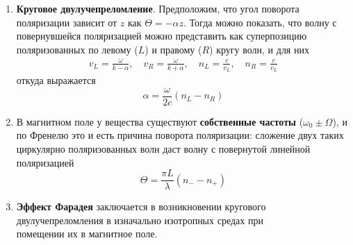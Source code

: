 \documentclass[10pt,pdf,hyperref={unicode}, dvipsnames]{beamer}
\begin{document}

\begin{frame}[t]
	\begin{enumerate}
		\item \textbf{Круговое двулучепреломление}. Предположим, что угол поворота поляризации зависит от $z$ как
		      $\Theta=-\alpha z$. Тогда можно показать, что волну с повернувшейся поляризацией можно представить как суперпозицию поляризованных по левому ($L$) и правому ($R$) кругу волн, и для них
		      \begin{gather*}
			      v_L=\frac{\omega}{k-\alpha},
			      \quad
			      v_R=\frac{\omega}{k+\alpha},
			      \quad
			      n_L=\frac{c}{v_L},
			      \quad
			      n_R=\frac{c}{v_L}
		      \end{gather*}
		      откуда выражается
		      \begin{equation*}
			      \alpha=\frac{\omega}{2c}(n_L-n_R)
		      \end{equation*}
		\item В магнитном поле у вещества существуют \textbf{собственные частоты} ($\omega_0\pm\Omega$),
		      и по Френелю это и есть причина поворота поляризации: сложение двух таких циркулярно поляризованных волн даст волну с повернутой линейной поляризацией
		      \begin{equation*}
			      \Theta=\frac{\pi L}{\lambda}(n_--n_+)
		      \end{equation*}
		\item \textbf{Эффект Фарадея} заключается в возникновении кругового двулучепреломления в изначально изотропных средах при \\помещении их в магнитное поле.
	\end{enumerate}
\end{frame}

\end{document}

